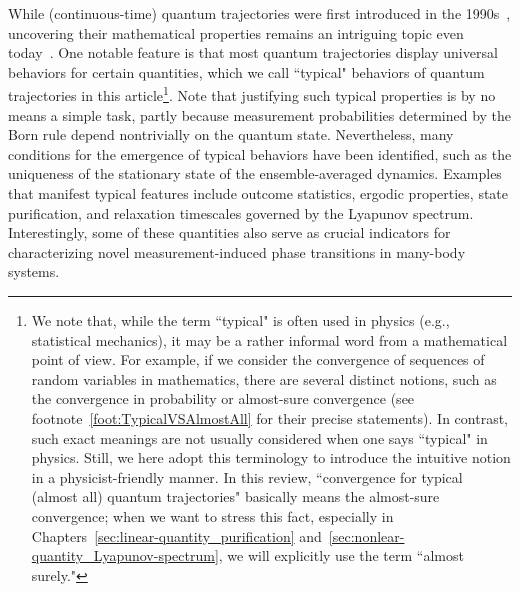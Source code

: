 \documentclass[preprint,pteplogo]{ptephy_v2}%
\numberwithin{equation}{section}
\theoremstyle{definition}
\begin{document}
While (continuous-time) quantum trajectories were first introduced in the 1990s~\cite{ueda1990nonequilibrium, dalibard1992wave, dum1992monte, carmichael2009open, plenio1998quantum}, uncovering their mathematical properties remains an intriguing topic even today~\cite{attal2015central, benoist2019invariant, carollo2019unraveling, bernard2021can, benoist2021invariant, benoist2023limit, tindall2023generality, girotti2023concentration, benoist2024quantum}.
One notable feature is that most quantum trajectories display universal behaviors for certain quantities, which we call ``typical" behaviors of quantum trajectories in this article\footnote{
We note that, while the term ``typical" is often used in physics (e.g., statistical mechanics), it may be a rather informal word from a mathematical point of view. 
For example, if we consider the convergence of sequences of random variables in mathematics, there are several distinct notions, such as the convergence in probability or almost-sure convergence (see footnote~\ref{foot:TypicalVSAlmostAll} for their precise statements).
In contrast, such exact meanings are not usually considered when one says ``typical" in physics.
Still, we here adopt this terminology to introduce the intuitive notion in a physicist-friendly manner.
In this review, ``convergence for typical (almost all) quantum trajectories" basically means the almost-sure convergence; when we want to stress this fact, especially in Chapters~\ref{sec:linear-quantity_purification} and~\ref{sec:nonlear-quantity_Lyapunov-spectrum}, we will explicitly use the term ``almost surely." 
}.
Note that justifying such typical properties is by no means a simple task, partly because measurement probabilities determined by the Born rule depend nontrivially on the quantum state.
Nevertheless, many conditions for the emergence of typical behaviors have been identified, such as the uniqueness of the stationary state of the ensemble-averaged dynamics.
Examples that manifest typical features include outcome statistics, ergodic properties, state purification, and relaxation timescales governed by the Lyapunov spectrum.
Interestingly, some of these quantities also serve as crucial indicators for characterizing novel measurement-induced phase transitions in many-body systems.
\end{document}

